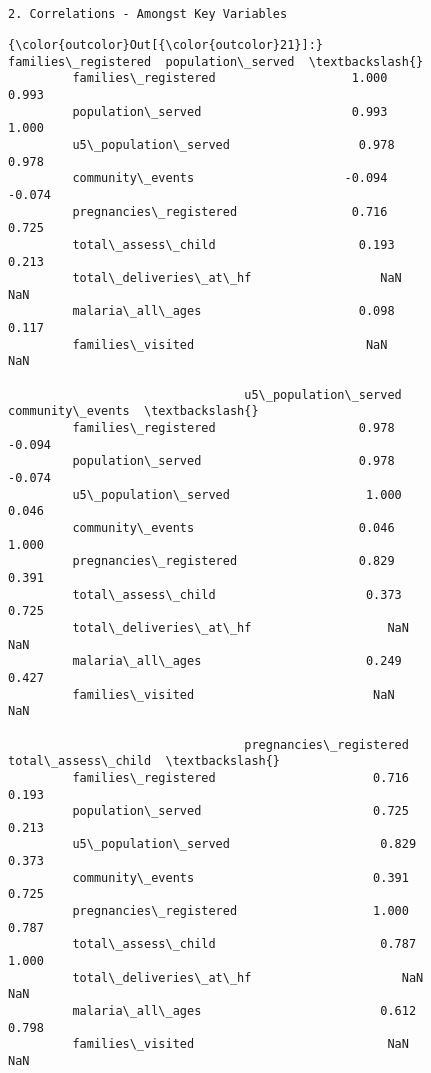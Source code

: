 \documentclass[11pt]{article}
\begin{document}
    \begin{Verbatim}[commandchars=\\\{\}]


2. Correlations - Amongst Key Variables

    \end{Verbatim}

\begin{Verbatim}[commandchars=\\\{\}]
{\color{outcolor}Out[{\color{outcolor}21}]:}                         families\_registered  population\_served  \textbackslash{}
         families\_registered                   1.000              0.993   
         population\_served                     0.993              1.000   
         u5\_population\_served                  0.978              0.978   
         community\_events                     -0.094             -0.074   
         pregnancies\_registered                0.716              0.725   
         total\_assess\_child                    0.193              0.213   
         total\_deliveries\_at\_hf                  NaN                NaN   
         malaria\_all\_ages                      0.098              0.117   
         families\_visited                        NaN                NaN   
         
                                 u5\_population\_served  community\_events  \textbackslash{}
         families\_registered                    0.978            -0.094   
         population\_served                      0.978            -0.074   
         u5\_population\_served                   1.000             0.046   
         community\_events                       0.046             1.000   
         pregnancies\_registered                 0.829             0.391   
         total\_assess\_child                     0.373             0.725   
         total\_deliveries\_at\_hf                   NaN               NaN   
         malaria\_all\_ages                       0.249             0.427   
         families\_visited                         NaN               NaN   
         
                                 pregnancies\_registered  total\_assess\_child  \textbackslash{}
         families\_registered                      0.716               0.193   
         population\_served                        0.725               0.213   
         u5\_population\_served                     0.829               0.373   
         community\_events                         0.391               0.725   
         pregnancies\_registered                   1.000               0.787   
         total\_assess\_child                       0.787               1.000   
         total\_deliveries\_at\_hf                     NaN                 NaN   
         malaria\_all\_ages                         0.612               0.798   
         families\_visited                           NaN                 NaN   
         

\end{Verbatim}
\end{document}
